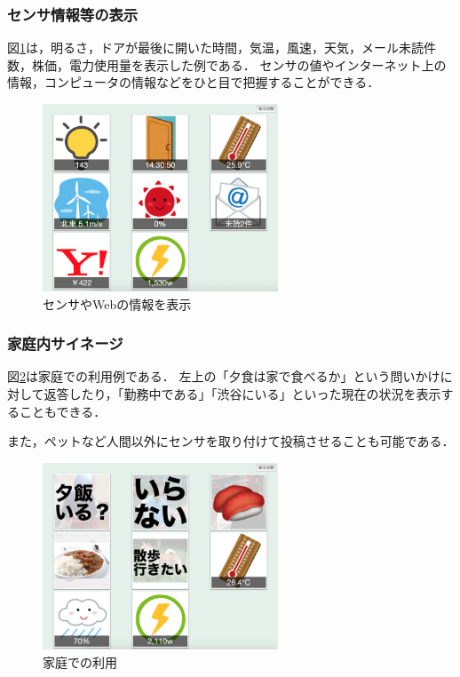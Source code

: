 \subsubsection{センサ情報等の表示}

図\ref{sensors}は，明るさ，ドアが最後に開いた時間，気温，風速，天気，メール未読件数，株価，電力使用量を表示した例である．
センサの値やインターネット上の情報，コンピュータの情報などをひと目で把握することができる．

\begin{figure}[h]
\centering
\includegraphics[width=7cm]{images/sensors.png}
\caption{センサやWebの情報を表示}
\label{sensors}
\end{figure}

\subsubsection{家庭内サイネージ}

図\ref{home}は家庭での利用例である．
左上の「夕食は家で食べるか」という問いかけに対して返答したり，「勤務中である」「渋谷にいる」といった現在の状況を表示することもできる．

また，ペットなど人間以外にセンサを取り付けて投稿させることも可能である．

\begin{figure}[h]
\centering
\includegraphics[width=7cm]{images/home.png}
\caption{家庭での利用}
\label{home}
\end{figure}